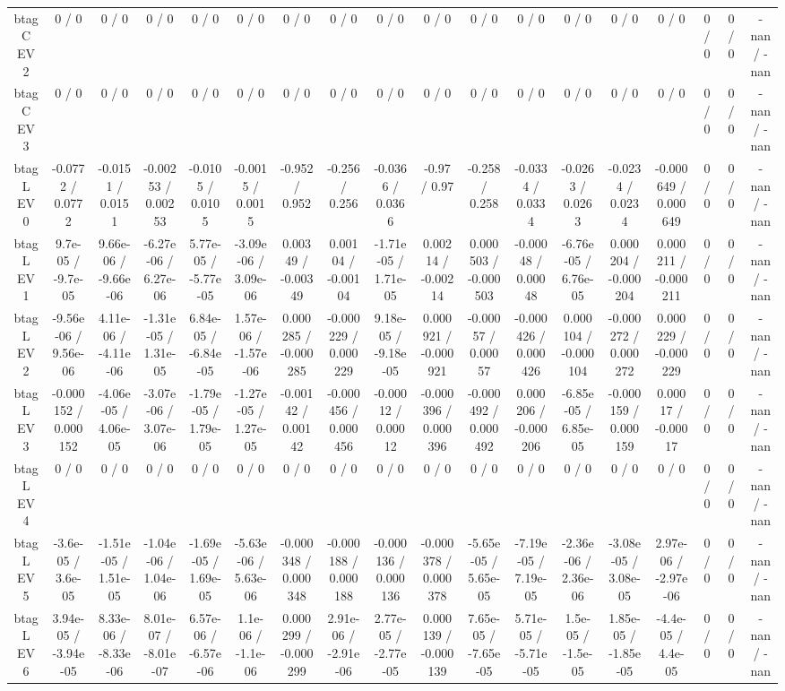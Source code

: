 \documentclass[10pt]{article}
\begin{document}
\begin{table}[htbp]
\begin{center}
\begin{tabular}{|c|c|c|c|c|c|c|c|c|c|c|c|c|c|c|c|c|c|}
  btag C EV 2 & 0 / 0 & 0 / 0 & 0 / 0 & 0 / 0 & 0 / 0 & 0 / 0 & 0 / 0 & 0 / 0 & 0 / 0 & 0 / 0 & 0 / 0 & 0 / 0 & 0 / 0 & 0 / 0 & 0 / 0 & 0 / 0 & -nan / -nan \\ 
  btag C EV 3 & 0 / 0 & 0 / 0 & 0 / 0 & 0 / 0 & 0 / 0 & 0 / 0 & 0 / 0 & 0 / 0 & 0 / 0 & 0 / 0 & 0 / 0 & 0 / 0 & 0 / 0 & 0 / 0 & 0 / 0 & 0 / 0 & -nan / -nan \\ 
  btag L EV 0 & -0.0772 / 0.0772 & -0.0151 / 0.0151 & -0.00253 / 0.00253 & -0.0105 / 0.0105 & -0.0015 / 0.0015 & -0.952 / 0.952 & -0.256 / 0.256 & -0.0366 / 0.0366 & -0.97 / 0.97 & -0.258 / 0.258 & -0.0334 / 0.0334 & -0.0263 / 0.0263 & -0.0234 / 0.0234 & -0.000649 / 0.000649 & 0 / 0 & 0 / 0 & -nan / -nan \\ 
  btag L EV 1 & 9.7e-05 / -9.7e-05 & 9.66e-06 / -9.66e-06 & -6.27e-06 / 6.27e-06 & 5.77e-05 / -5.77e-05 & -3.09e-06 / 3.09e-06 & 0.00349 / -0.00349 & 0.00104 / -0.00104 & -1.71e-05 / 1.71e-05 & 0.00214 / -0.00214 & 0.000503 / -0.000503 & -0.00048 / 0.00048 & -6.76e-05 / 6.76e-05 & 0.000204 / -0.000204 & 0.000211 / -0.000211 & 0 / 0 & 0 / 0 & -nan / -nan \\ 
  btag L EV 2 & -9.56e-06 / 9.56e-06 & 4.11e-06 / -4.11e-06 & -1.31e-05 / 1.31e-05 & 6.84e-05 / -6.84e-05 & 1.57e-06 / -1.57e-06 & 0.000285 / -0.000285 & -0.000229 / 0.000229 & 9.18e-05 / -9.18e-05 & 0.000921 / -0.000921 & -0.00057 / 0.00057 & -0.000426 / 0.000426 & 0.000104 / -0.000104 & -0.000272 / 0.000272 & 0.000229 / -0.000229 & 0 / 0 & 0 / 0 & -nan / -nan \\ 
  btag L EV 3 & -0.000152 / 0.000152 & -4.06e-05 / 4.06e-05 & -3.07e-06 / 3.07e-06 & -1.79e-05 / 1.79e-05 & -1.27e-05 / 1.27e-05 & -0.00142 / 0.00142 & -0.000456 / 0.000456 & -0.00012 / 0.00012 & -0.000396 / 0.000396 & -0.000492 / 0.000492 & 0.000206 / -0.000206 & -6.85e-05 / 6.85e-05 & -0.000159 / 0.000159 & 0.00017 / -0.00017 & 0 / 0 & 0 / 0 & -nan / -nan \\ 
  btag L EV 4 & 0 / 0 & 0 / 0 & 0 / 0 & 0 / 0 & 0 / 0 & 0 / 0 & 0 / 0 & 0 / 0 & 0 / 0 & 0 / 0 & 0 / 0 & 0 / 0 & 0 / 0 & 0 / 0 & 0 / 0 & 0 / 0 & -nan / -nan \\ 
  btag L EV 5 & -3.6e-05 / 3.6e-05 & -1.51e-05 / 1.51e-05 & -1.04e-06 / 1.04e-06 & -1.69e-05 / 1.69e-05 & -5.63e-06 / 5.63e-06 & -0.000348 / 0.000348 & -0.000188 / 0.000188 & -0.000136 / 0.000136 & -0.000378 / 0.000378 & -5.65e-05 / 5.65e-05 & -7.19e-05 / 7.19e-05 & -2.36e-06 / 2.36e-06 & -3.08e-05 / 3.08e-05 & 2.97e-06 / -2.97e-06 & 0 / 0 & 0 / 0 & -nan / -nan \\ 
  btag L EV 6 & 3.94e-05 / -3.94e-05 & 8.33e-06 / -8.33e-06 & 8.01e-07 / -8.01e-07 & 6.57e-06 / -6.57e-06 & 1.1e-06 / -1.1e-06 & 0.000299 / -0.000299 & 2.91e-06 / -2.91e-06 & 2.77e-05 / -2.77e-05 & 0.000139 / -0.000139 & 7.65e-05 / -7.65e-05 & 5.71e-05 / -5.71e-05 & 1.5e-05 / -1.5e-05 & 1.85e-05 / -1.85e-05 & -4.4e-05 / 4.4e-05 & 0 / 0 & 0 / 0 & -nan / -nan \\ 

\end{tabular}
\end{center}
\end{table}
\end{document}

